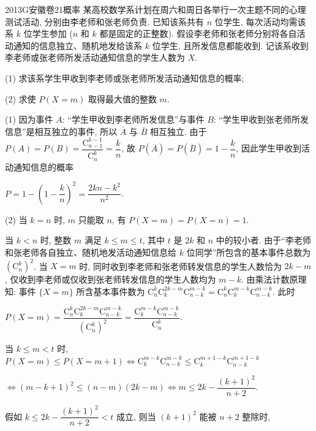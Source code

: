 
\begin{problem}{2013}{G}{安徽卷}{21}{概率}
某高校数学系计划在周六和周日各举行一次主题不同的心理测试活动, 分别由李老师和张老师负责. 已知该系共有 $n$ 位学生, 每次活动均需该系 $k$ 位学生参加 ($n$ 和 $k$ 都是固定的正整数). 假设李老师和张老师分别将各自活动通知的信息独立、随机地发给该系 $k$ 位学生, 且所发信息都能收到. 记该系收到李老师或张老师所发活动通知信息的学生人数为 $X$.

(1) 求该系学生甲收到李老师或张老师所发活动通知信息的概率;

(2) 求使 $P(X=m)$ 取得最大值的整数 $m$.
\end{problem}


\begin{solutions}
(1) 因为事件 $A$: “学生甲收到李老师所发信息”与事件 $B$: “学生甲收到张老师所发信息”是相互独立的事件, 所以 $\overline{A}$ 与 $\overline{B}$ 相互独立. 由于 $P(A)=P(B)=\dfrac{\mathrm{C}_{n-1}^{k-1}}{\mathrm{C}_n^k}=\dfrac{k}{n}$, 故 $P(\overline{A})=P(\overline{B})=1-\dfrac{k}{n}$, 因此学生甲收到活动通知信息的概率

$P=1-(1-\dfrac{k}{n})^2=\dfrac{2kn-k^2}{n^2}$.

(2) 当 $k=n$ 时, $m$ 只能取 $n$, 有 $P(X=m)=P(X=n)=1$.

当 $k<n$ 时, 整数 $m$ 满足 $k \le m \le t$, 其中 $t$ 是 $2k$ 和 $n$ 中的较小者. 由于“李老师和张老师各自独立、随机地发活动通知信息给 $k$ 位同学”所包含的基本事件总数为 $(\mathrm{C}_n^k)^2$. 当 $X=m$ 时, 同时收到李老师和张老师转发信息的学生人数恰为 $2k-m$, 仅收到李老师或仅收到张老师转发信息的学生人数均为 $m-k$. 由乘法计数原理知: 事件 $\{X=m\}$ 所含基本事件数为 $\mathrm{C}_n^k \mathrm{C}_k^{2k-m} \mathrm{C}_{n-k}^{m-k} = \mathrm{C}_n^k \mathrm{C}_k^{m-k} \mathrm{C}_{n-k}^{m-k}$.
此时

$P(X=m) = \dfrac{\mathrm{C}_n^k \mathrm{C}_k^{2k-m} \mathrm{C}_{n-k}^{m-k}}{(\mathrm{C}_n^k)^2} = \dfrac{\mathrm{C}_k^{m-k} \mathrm{C}_{n-k}^{m-k}}{\mathrm{C}_n^k}$.

当 $k \le m < t$ 时, $P(X=m) \le P(X=m+1) \Leftrightarrow \mathrm{C}_k^{m-k} \mathrm{C}_{n-k}^{m-k} \le \mathrm{C}_k^{m+1-k} \mathrm{C}_{n-k}^{m+1-k}$

$\Leftrightarrow (m-k+1)^2 \le (n-m)(2k-m) \Leftrightarrow m \le 2k - \dfrac{(k+1)^2}{n+2}$.

假如 $k \le 2k - \dfrac{(k+1)^2}{n+2} < t$ 成立, 则当 $(k+1)^2$ 能被 $n+2$ 整除时,


\end{solutions}
